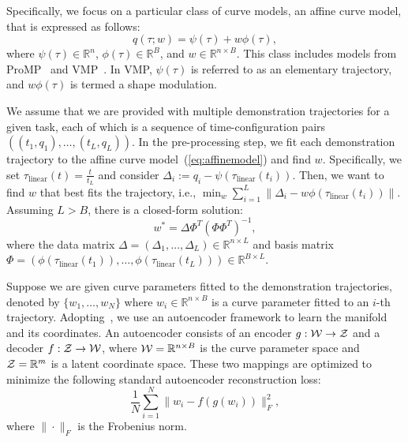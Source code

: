 Specifically, we focus on a particular class of curve models, an affine curve model, that is expressed as follows:
\begin{equation}
\label{eq:affinemodel}
    q(\tau; w) = \psi(\tau) + w \phi(\tau),
\end{equation}
where $\psi(\tau) \in \mathbb{R}^{n}$, $\phi(\tau) \in \mathbb{R}^{B}$, and $w \in \mathbb{R}^{n \times B}$. This class includes models from ProMP~\cite{paraschos2013probabilistic} and VMP~\cite{zhou2019learning}. In VMP, $\psi(\tau)$ is referred to as an elementary trajectory, and $w\phi(\tau)$ is termed a shape modulation. 

We assume that we are provided with multiple demonstration trajectories for a given task, each of which is a sequence of time-configuration pairs $((t_1, q_1), \ldots, (t_L, q_L))$. 
In the pre-processing step, we fit each demonstration trajectory to the affine curve model~(\ref{eq:affinemodel}) and find $w$.
Specifically, we set $\tau_{\text{linear}}(t) = \frac{t}{t_L}$ and consider $\Delta_{i}:=q_{i} - \psi(\tau_{\text{linear}}(t_i))$. Then, we want to find $w$ that best fits the trajectory, i.e., $\min_{w} \sum_{i=1}^{L}\|\Delta_i - w\phi(\tau_{\text{linear}}(t_i)) \|$. Assuming $L > B$, there is a closed-form solution:
\begin{equation}
    w^* = \Delta \Phi^T (\Phi \Phi^T)^{-1},
\end{equation}
where the data matrix $\Delta=(\Delta_1, \ldots, \Delta_L) \in \mathbb{R}^{n \times L}$ and basis matrix $\Phi=(\phi(\tau_{\text{linear}}(t_1)), \ldots, \phi(\tau_{\text{linear}}(t_L)))\in \mathbb{R}^{B \times L}$.

Suppose we are given curve parameters fitted to the demonstration trajectories, denoted by $\{w_1, \ldots, w_N\}$ where $w_i \in \mathbb{R}^{n \times B}$ is a curve parameter fitted to an $i$-th trajectory. 
Adopting~\cite{noseworthy2020task, lee2023equivariant}, we use an autoencoder framework to learn the manifold and its coordinates. An autoencoder consists of an encoder $g:{\cal W} \to {\cal Z}$ and a decoder $f: {\cal Z} \to {\cal W}$, where ${\cal W} = \mathbb{R}^{n\times B}$ is the curve parameter space and ${\cal Z} = \mathbb{R}^{m}$ is a latent coordinate space. 
These two mappings are optimized to minimize the following standard autoencoder reconstruction loss:
\begin{equation}
\label{eq:recon_loss}
    \frac{1}{N} \sum_{i=1}^{N} \|w_i - f(g(w_i))\|_F^2,
\end{equation}
where $\|\cdot\|_F$ is the Frobenius norm.

